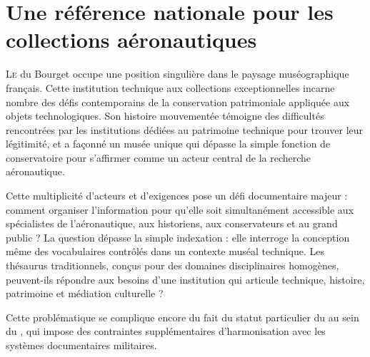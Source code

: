\chapter[Référence nationale]{\label{I-A}Une référence nationale pour les collections aéronautiques}

\lettrine{L}e \maelong du Bourget occupe une position singulière dans le paysage muséographique français. Cette institution technique aux collections exceptionnelles incarne nombre des défis contemporains de la conservation patrimoniale appliquée aux objets technologiques. Son histoire mouvementée témoigne des difficultés rencontrées par les institutions dédiées au patrimoine technique pour trouver leur légitimité, et a façonné un musée unique qui dépasse la simple fonction de conservatoire pour s'affirmer comme un acteur central de la recherche aéronautique.






\bigskip
\bigskip
\bigskip

Cette multiplicité d'acteurs et d'exigences pose un défi documentaire majeur : comment organiser l'information pour qu'elle soit simultanément accessible aux spécialistes de l'aéronautique, aux historiens, aux conservateurs et au grand public ? La question dépasse la simple indexation : elle interroge la conception même des vocabulaires contrôlés dans un contexte muséal technique. Les thésaurus traditionnels, conçus pour des domaines disciplinaires homogènes, peuvent-ils répondre aux besoins d'une institution qui articule technique, histoire, patrimoine et médiation culturelle ?

Cette problématique se complique encore du fait du statut particulier du \mae au sein du \minarm, qui impose des contraintes supplémentaires d'harmonisation avec les systèmes documentaires militaires.